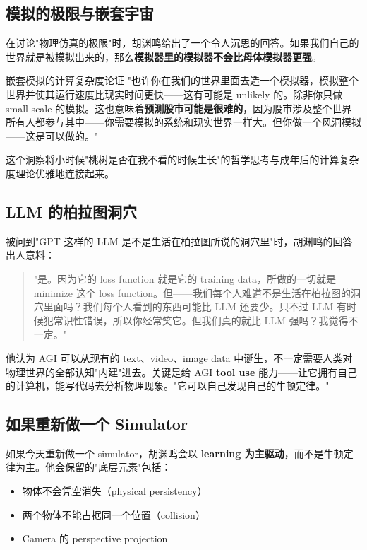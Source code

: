 \subsection{模拟的极限与嵌套宇宙}

在讨论"物理仿真的极限"时，胡渊鸣给出了一个令人沉思的回答。如果我们自己的世界就是被模拟出来的，那么\textbf{模拟器里的模拟器不会比母体模拟器更强}。

\begin{knowledgebox}{嵌套模拟的计算复杂度论证}
"也许你在我们的世界里面去造一个模拟器，模拟整个世界并使其运行速度比现实时间更快——这有可能是 unlikely 的。除非你只做 small scale 的模拟。这也意味着\textbf{预测股市可能是很难的}，因为股市涉及整个世界所有人都参与其中——你需要模拟的系统和现实世界一样大。但你做一个风洞模拟——这是可以做的。"
\end{knowledgebox}

这个洞察将小时候"桃树是否在我不看的时候生长"的哲学思考与成年后的计算复杂度理论优雅地连接起来。

\subsection{LLM 的柏拉图洞穴}

被问到"GPT 这样的 LLM 是不是生活在柏拉图所说的洞穴里"时，胡渊鸣的回答出人意料：

\begin{quote}
"是。因为它的 loss function 就是它的 training data，所做的一切就是 minimize 这个 loss function。但——我们每个人难道不是生活在柏拉图的洞穴里面吗？我们每个人看到的东西可能比 LLM 还要少。只不过 LLM 有时候犯常识性错误，所以你经常笑它。但我们真的就比 LLM 强吗？我觉得不一定。"
\end{quote}

他认为 AGI 可以从现有的 text、video、image data 中诞生，不一定需要人类对物理世界的全部认知"内建"进去。关键是给 AGI \textbf{tool use} 能力——让它拥有自己的计算机，能写代码去分析物理现象。"它可以自己发现自己的牛顿定律。"

\subsection{如果重新做一个 Simulator}

如果今天重新做一个 simulator，胡渊鸣会以 \textbf{learning 为主驱动}，而不是牛顿定律为主。他会保留的"底层元素"包括：
\begin{itemize}
\item 物体不会凭空消失（physical persistency）
\item 两个物体不能占据同一个位置（collision）
\item Camera 的 perspective projection
\end{itemize}

